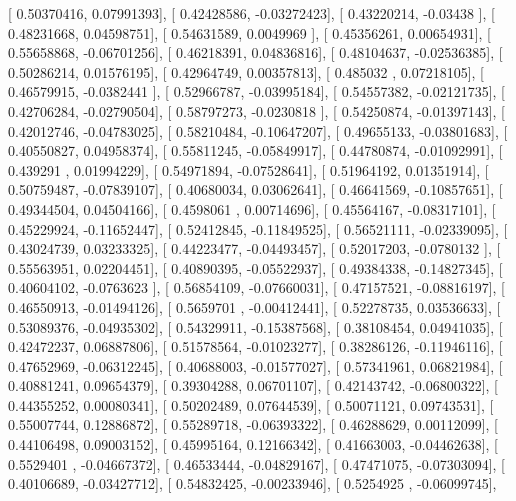 \documentclass{article}
\begin{document}
       [ 0.50370416,  0.07991393],
       [ 0.42428586, -0.03272423],
       [ 0.43220214, -0.03438   ],
       [ 0.48231668,  0.04598751],
       [ 0.54631589,  0.0049969 ],
       [ 0.45356261,  0.00654931],
       [ 0.55658868, -0.06701256],
       [ 0.46218391,  0.04836816],
       [ 0.48104637, -0.02536385],
       [ 0.50286214,  0.01576195],
       [ 0.42964749,  0.00357813],
       [ 0.485032  ,  0.07218105],
       [ 0.46579915, -0.0382441 ],
       [ 0.52966787, -0.03995184],
       [ 0.54557382, -0.02121735],
       [ 0.42706284, -0.02790504],
       [ 0.58797273, -0.0230818 ],
       [ 0.54250874, -0.01397143],
       [ 0.42012746, -0.04783025],
       [ 0.58210484, -0.10647207],
       [ 0.49655133, -0.03801683],
       [ 0.40550827,  0.04958374],
       [ 0.55811245, -0.05849917],
       [ 0.44780874, -0.01092991],
       [ 0.439291  ,  0.01994229],
       [ 0.54971894, -0.07528641],
       [ 0.51964192,  0.01351914],
       [ 0.50759487, -0.07839107],
       [ 0.40680034,  0.03062641],
       [ 0.46641569, -0.10857651],
       [ 0.49344504,  0.04504166],
       [ 0.4598061 ,  0.00714696],
       [ 0.45564167, -0.08317101],
       [ 0.45229924, -0.11652447],
       [ 0.52412845, -0.11849525],
       [ 0.56521111, -0.02339095],
       [ 0.43024739,  0.03233325],
       [ 0.44223477, -0.04493457],
       [ 0.52017203, -0.0780132 ],
       [ 0.55563951,  0.02204451],
       [ 0.40890395, -0.05522937],
       [ 0.49384338, -0.14827345],
       [ 0.40604102, -0.0763623 ],
       [ 0.56854109, -0.07660031],
       [ 0.47157521, -0.08816197],
       [ 0.46550913, -0.01494126],
       [ 0.5659701 , -0.00412441],
       [ 0.52278735,  0.03536633],
       [ 0.53089376, -0.04935302],
       [ 0.54329911, -0.15387568],
       [ 0.38108454,  0.04941035],
       [ 0.42472237,  0.06887806],
       [ 0.51578564, -0.01023277],
       [ 0.38286126, -0.11946116],
       [ 0.47652969, -0.06312245],
       [ 0.40688003, -0.01577027],
       [ 0.57341961,  0.06821984],
       [ 0.40881241,  0.09654379],
       [ 0.39304288,  0.06701107],
       [ 0.42143742, -0.06800322],
       [ 0.44355252,  0.00080341],
       [ 0.50202489,  0.07644539],
       [ 0.50071121,  0.09743531],
       [ 0.55007744,  0.12886872],
       [ 0.55289718, -0.06393322],
       [ 0.46288629,  0.00112099],
       [ 0.44106498,  0.09003152],
       [ 0.45995164,  0.12166342],
       [ 0.41663003, -0.04462638],
       [ 0.5529401 , -0.04667372],
       [ 0.46533444, -0.04829167],
       [ 0.47471075, -0.07303094],
       [ 0.40106689, -0.03427712],
       [ 0.54832425, -0.00233946],
       [ 0.5254925 , -0.06099745],
\end{document}
